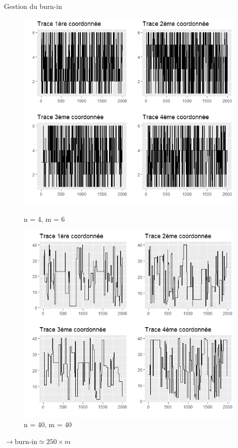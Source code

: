 \documentclass[10pt,xcolor=table,color={dvipsnames,usenames},ignorenonframetext,usepdftitle=false,french]{beamer}
\begin{document}
\begin{frame}{Gestion du burn-in}
\protect\hypertarget{gestion-du-burn-in}{}

\begin{figure}
\begin{minipage}{.5\textwidth}
\includegraphics[width=1\textwidth]{img/n_4_m_6.png}
\captionsetup{margin=0cm,format=hang,justification=justified}
\caption{n = 4, m = 6}
\end{minipage}%
\begin{minipage}{.5\textwidth}
\includegraphics[width=1\textwidth]{img/n_40_m_40.png}
\captionsetup{margin=0cm,format=hang,justification=justified}
\caption{n = 40, m = 40}
\end{minipage}
\end{figure}

\bigskip

\bigskip

\(\rightarrow\text{burn-in}\simeq250\times m\)

\end{frame}
\end{document}
